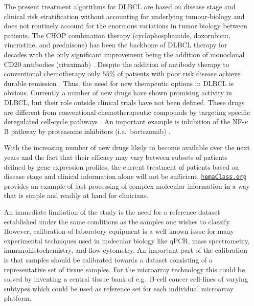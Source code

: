 \documentclass[twocolumn]{bmcart}%
\newcommand{\hemaClass}{\href{http://hemaClass.org}{\texttt{hemaClass.org}}}
\begin{document}
The present treatment algorithms for DLBCL are based on disease stage and clinical risk stratification without accounting for underlying tumour-biology \cite{Schmoll2012} and does not routinely account for the enormous variations in tumor biology between patients.
The CHOP combination therapy (cyclophosphamide, doxorubicin, vincristine, and prednisone) has been the backbone of DLBCL therapy for decades with the only significant improvement being the addition of monoclonal CD20 antibodies (rituximab) \cite{Coiffier2002a}.
Despite the addition of antibody therapy to conventional chemotherapy only $55\%$ of patients with poor risk disease achieve durable remission \cite{Ziepert2010}.
Thus, the need for new therapeutic options in DLBCL is obvious.
Currently a number of new drugs have shown promising activity in DLBCL, but their role outside clinical trials have not been defined.
These drugs are different from conventional chemotherapeutic compounds by targeting specific deregulated cell-cycle pathways \citep{Friedberg2011}.
An important example is inhibition of the NF-$\kappa$B pathway by proteasome inhibitors (i.e.\ bortezomib) \citep{Dunleavy2009}.

With the increasing number of new drugs likely to become available over the next years and the fact that their efficacy may vary between subsets of patients defined by gene expression profiles, the current treatment of patients based on disease stage and clinical information alone will not be sufficient.
\hemaClass{} provides an example of fast processing of complex molecular information in a way that is simple and readily at hand for clinicians.

An immediate limitation of the study is the need for a reference dataset established under the same conditions as the samples one wishes to classify.
However, calibration of laboratory equipment is a well-known issue for many experimental techniques used in molecular biology like qPCR, mass spectrometry, immunohistochemistry, and flow cytometry.
An important part of the calibration is that samples should be calibrated towards a dataset consisting of a representative set of tissue samples.
For the microarray technology this could be solved by inventing a central tissue bank of e.g.\ B-cell cancer cell-lines of varying subtypes which could be used as reference set for each individual microarray platform.
\end{document}
